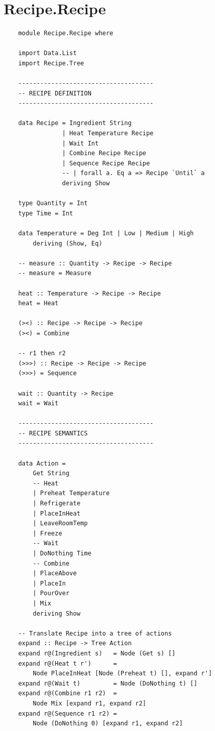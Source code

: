 \documentclass[11pt]{article}
\begin{document}
    \newpage

    \appendix

    \section{Recipe.Recipe}

    \begin{tt}
    \small
    \begin{lstlisting}
    module Recipe.Recipe where
    
    import Data.List
    import Recipe.Tree
    
    -------------------------------------
    -- RECIPE DEFINITION
    -------------------------------------
    
    data Recipe = Ingredient String
                | Heat Temperature Recipe
                | Wait Int
                | Combine Recipe Recipe
                | Sequence Recipe Recipe
                -- | forall a. Eq a => Recipe `Until` a
                deriving Show
    
    type Quantity = Int
    type Time = Int
    
    data Temperature = Deg Int | Low | Medium | High
        deriving (Show, Eq)
    
    -- measure :: Quantity -> Recipe -> Recipe
    -- measure = Measure
    
    heat :: Temperature -> Recipe -> Recipe
    heat = Heat
    
    (><) :: Recipe -> Recipe -> Recipe
    (><) = Combine
    
    -- r1 then r2
    (>>>) :: Recipe -> Recipe -> Recipe
    (>>>) = Sequence
    
    wait :: Quantity -> Recipe
    wait = Wait
    
    -------------------------------------
    -- RECIPE SEMANTICS
    -------------------------------------
    
    data Action =
        Get String
        -- Heat
        | Preheat Temperature
        | Refrigerate
        | PlaceInHeat
        | LeaveRoomTemp
        | Freeze
        -- Wait
        | DoNothing Time
        -- Combine
        | PlaceAbove
        | PlaceIn
        | PourOver
        | Mix
        deriving Show

    -- Translate Recipe into a tree of actions
    expand :: Recipe -> Tree Action
    expand r@(Ingredient s)   = Node (Get s) []
    expand r@(Heat t r')      =
        Node PlaceInHeat [Node (Preheat t) [], expand r']
    expand r@(Wait t)         = Node (DoNothing t) []
    expand r@(Combine r1 r2)  =
        Node Mix [expand r1, expand r2]
    expand r@(Sequence r1 r2) =
        Node (DoNothing 0) [expand r1, expand r2]


\end{lstlisting}
\end{tt}
\end{document}
